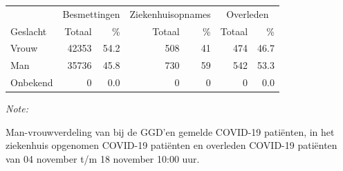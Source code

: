 \documentclass[
  english,
  man,floatsintext]{apa6}
\begin{document}
\begin{table}[H]
\centering\begingroup\fontsize{11}{13}\selectfont

\begin{threeparttable}
\begin{tabular}{lrrrrrr}
\toprule
\multicolumn{1}{c}{ } & \multicolumn{2}{c}{Besmettingen} & \multicolumn{2}{c}{Ziekenhuisopnames} & \multicolumn{2}{c}{Overleden} \\
\cmidrule(l{3pt}r{3pt}){2-3} \cmidrule(l{3pt}r{3pt}){4-5} \cmidrule(l{3pt}r{3pt}){6-7}
Geslacht & Totaal & \% & Totaal & \% & Totaal & \%\\
\midrule
Vrouw & 42353 & 54.2 & 508 & 41 & 474 & 46.7\\
Man & 35736 & 45.8 & 730 & 59 & 542 & 53.3\\
Onbekend & 0 & 0.0 & 0 & 0 & 0 & 0.0\\
\bottomrule
\end{tabular}
\begin{tablenotes}
\item \textit{Note: } 
\item Man-vrouwverdeling van bij de GGD’en gemelde COVID-19 patiënten, in het ziekenhuis opgenomen COVID-19 patiënten en overleden COVID-19 patiënten van 04 november t/m 18 november 10:00 uur.
\end{tablenotes}
\end{threeparttable}
\endgroup{}
\end{table}
\newpage
\end{document}
